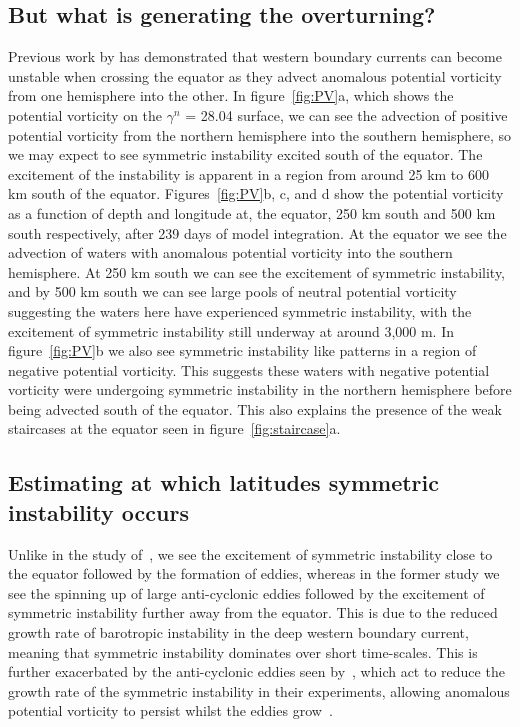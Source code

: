 \subsection{But what is generating the overturning?}
 Previous work by \citet{Goldsworth2021} has demonstrated that western boundary currents can become unstable when crossing the equator as they advect anomalous potential vorticity from one hemisphere into the other. In figure~\ref{fig:PV}a, which shows the potential vorticity on the $\gamma^n$ = 28.04 surface, we can see the advection of positive potential vorticity from the northern hemisphere into the southern hemisphere, so we may expect to see symmetric instability excited south of the equator. The excitement of the instability is apparent in a region from around 25 km to 600 km south of the equator. Figures~\ref{fig:PV}b, c, and d show the potential vorticity as a function of depth and longitude at, the equator, 250 km south and 500 km south respectively, after 239 days of model integration. At the equator we see the advection of waters with anomalous potential vorticity into the southern hemisphere. At 250 km south we can see the excitement of symmetric instability, and by 500 km south we can see large pools of neutral potential vorticity suggesting the waters here have experienced symmetric instability, with the excitement of symmetric instability still underway at around 3,000 m. In figure~\ref{fig:PV}b we also see symmetric instability like patterns in a region of negative potential vorticity. This suggests these waters with negative potential vorticity were undergoing symmetric instability in the northern hemisphere  before being advected south of the equator. This also explains the presence of the weak staircases at the equator seen in figure~\ref{fig:staircase}a.

\subsection{Estimating at which latitudes symmetric instability occurs}
\label{sec:relation2nbc}
Unlike in the study of~\citet{Goldsworth2021}, we see the excitement of symmetric instability close to the equator followed by the formation of eddies, whereas in the former study we see the spinning up of large anti-cyclonic eddies followed by the excitement of symmetric instability further away from the equator. This is due to the reduced growth rate of barotropic instability in the deep western boundary current, meaning that symmetric instability dominates over short time-scales. This is further exacerbated by the anti-cyclonic eddies seen by~\citet{Goldsworth2021}, which act to reduce the growth rate of the symmetric instability in their experiments, allowing anomalous potential vorticity to persist whilst the eddies grow~\citep{Buckingham2021}. 

